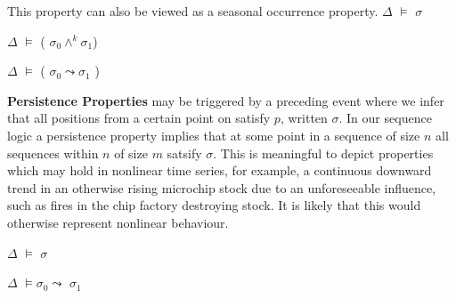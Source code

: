 
\begin{definition}\label{lem:canresp}
\begin{rm}
This property can also be viewed as a seasonal occurrence property.
$\Delta$ $\models$  $\sigma$
\end{rm}
\end{definition}



\begin{definition}\label{lem:response}
\begin{rm}
$\Delta$ $\models$  ( $\sigma_0 \wedge^k \sigma_1$) 
\end{rm}
\end{definition}



\begin{definition}\label{lem:seasresponse}
\begin{rm}
$\Delta$ $\models$  ( $\sigma_0 \leadsto \sigma_1$ )
\end{rm}
\end{definition}


{ \bf Persistence Properties } may be triggered by a preceding
event where we infer that all positions from a certain point on
satisfy $p$, written  $\sigma$. In our sequence logic a
persistence property implies that at some point in a sequence of size
$n$ all sequences within $n$ of size $m$ satsify $\sigma$. This is
meaningful to depict properties which may hold in nonlinear time
series, for example, a continuous downward trend in an otherwise
rising microchip stock
due to an unforeseeable influence, such as fires in the chip factory
destroying stock. It is likely that this would otherwise represent
nonlinear behaviour.


\begin{definition}\label{lem:persist}
\begin{rm}
$\Delta$ $\models$  $\sigma$
\end{rm}
\end{definition}


\begin{definition}\label{lem:ord_persist}
\begin{rm}
$\Delta$ $\models \sigma_0 \leadsto$  $\sigma_1$
\end{rm}
\end{definition}

